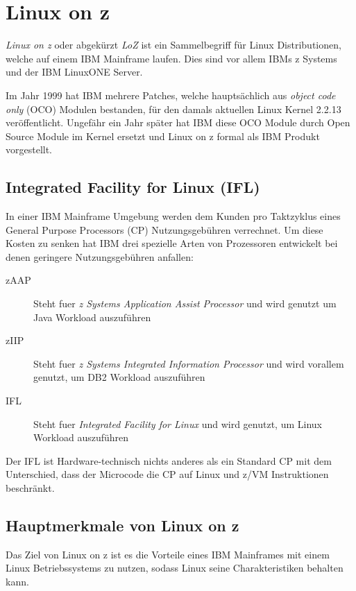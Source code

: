 \chapter{Linux on z}
\label{cha:Linux_on_z}

\textit{Linux on z} oder abgekürzt \textit{LoZ} ist ein Sammelbegriff für Linux Distributionen, welche auf einem IBM Mainframe laufen.
Dies sind vor allem IBMs z Systems und der IBM LinuxONE Server.\cite{LinuxOnZWiki}

Im Jahr 1999 hat IBM mehrere Patches, welche hauptsächlich aus \textit{object code only} (OCO) Modulen bestanden, für den damals aktuellen Linux Kernel 2.2.13 veröffentlicht.
Ungefähr ein Jahr später hat IBM diese OCO Module durch Open Source Module im Kernel ersetzt und Linux on z formal als IBM Produkt vorgestellt.\cite{LinuxOnZWikiHistory}

\section{Integrated Facility for Linux (IFL)}

In einer IBM Mainframe Umgebung werden dem Kunden pro Taktzyklus eines General Purpose Processors (CP) Nutzungsgebühren verrechnet.
Um diese Kosten zu senken hat IBM drei spezielle Arten von Prozessoren entwickelt bei denen geringere Nutzungsgebühren anfallen:
\begin{description}
    \item[zAAP]{Steht fuer \textit{z Systems Application Assist Processor} und wird genutzt um Java Workload auszuführen\cite{IBMzAAP}}
    \item[zIIP]{Steht fuer \textit{z Systems Integrated Information Processor} und wird vorallem genutzt, um DB2 Workload auszuführen\cite{IBMzIIP}}
    \item[IFL]{Steht fuer \textit{Integrated Facility for Linux} und wird genutzt, um Linux Workload auszuführen\cite{IBMIFL}}
\end{description}
Der IFL ist Hardware-technisch nichts anderes als ein Standard CP mit dem Unterschied, dass der Microcode die CP auf Linux und z/VM Instruktionen beschränkt.

\section{Hauptmerkmale von Linux on z}

Das Ziel von Linux on z ist es die Vorteile eines IBM Mainframes mit einem Linux Betriebssystems zu nutzen, sodass Linux seine Charakteristiken behalten kann.

